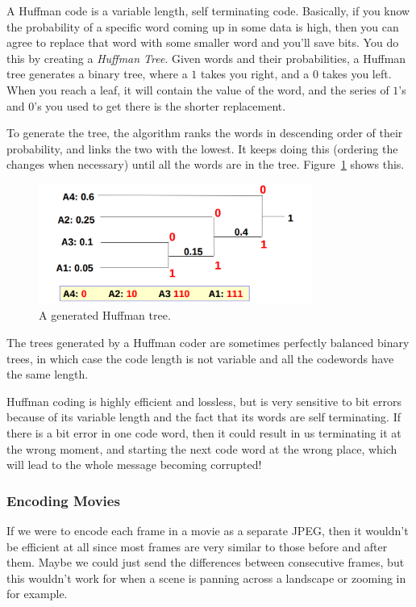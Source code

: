 A Huffman code is a variable length, self terminating code. Basically, if you
know the probability of a specific word coming up in some data is high, then you
can agree to replace that word with some smaller word and you'll save bits. You
do this by creating a \textit{Huffman Tree}. Given words and their
probabilities, a Huffman tree generates a binary tree, where a $1$ takes you
right, and a $0$ takes you left. When you reach a leaf, it will contain the
value of the word, and the series of $1$'s and $0$'s you used to get there is
the shorter replacement.

To generate the tree, the algorithm ranks the words in descending order of their
probability, and links the two with the lowest. It keeps doing this (ordering
the changes when necessary) until all the words are in the tree.
Figure~\ref{huffman} shows this.

\begin{figure}[ht]
  \centering
  \includegraphics[width=0.8\textwidth]{images/huffman}
  \caption{A generated Huffman tree.}
  \label{huffman}
\end{figure}

The trees generated by a Huffman coder are sometimes perfectly balanced binary
trees, in which case the code length is not variable and all the codewords have
the same length.

Huffman coding is highly efficient and lossless, but is very sensitive to bit
errors because of its variable length and the fact that its words are self
terminating. If there is a bit error in one code word, then it could result in
us terminating it at the wrong moment, and starting the next code word at the
wrong place, which will lead to the whole message becoming corrupted!

\subsubsection{Encoding Movies}

If we were to encode each frame in a movie as a separate JPEG, then it wouldn't
be efficient at all since most frames are very similar to those before and after
them. Maybe we could just send the differences between consecutive frames, but
this wouldn't work for when a scene is panning across a landscape or zooming in
for example.

